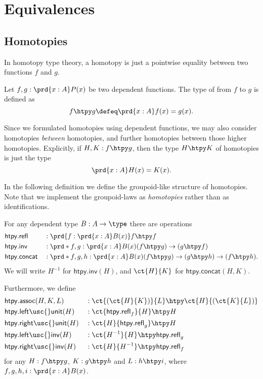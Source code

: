 \chapter{Equivalences}

\section{Homotopies}
In homotopy type theory, a homotopy is just a pointwise equality between two functions $f$ and $g$.

\begin{defn}
Let $f,g:\prd{x:A}P(x)$ be two dependent functions. The type of  from $f$ to $g$ is defined as
\begin{equation*}
f\htpy g \defeq \prd{x:A} f(x)=g(x).
\end{equation*}
\end{defn}

Since we formulated homotopies using dependent functions, we may also consider homotopies \emph{between} homotopies, and further homotopies between those higher homotopies. 
Explicitly, if $H,K:f\htpy g$, then the type $H\htpy K$ of homotopies is just the type
\begin{equation*}
\prd{x:A} H(x)=K(x).
\end{equation*}

In the following definition we define the groupoid-like structure of homotopies. Note that we implement the groupoid-laws as \emph{homotopies} rather than as identifications.

\begin{defn}\label{defn:htpy_groupoid}
For any dependent type $B:A\to\type$ there are operations
\begin{align*}
& \mathsf{htpy.refl} & & : \prd{f:\prd{x:A}B(x)}f\htpy f \\
& \mathsf{htpy.inv} & & : \prd*{f,g:\prd{x:A}B(x)} (f\htpy g)\to(g\htpy f) \\
& \mathsf{htpy.concat} & & : \prd*{f,g,h:\prd{x:A}B(x)} (f\htpy g)\to (g\htpy h)\to (f\htpy h).
\end{align*}
We will write $H^{-1}$ for $\mathsf{htpy.inv}(H)$, and $\ct{H}{K}$ for $\mathsf{htpy.concat}(H,K)$. 

Furthermore, we define
\begin{align*}
& \mathsf{htpy.assoc}(H,K,L) & & : \ct{(\ct{H}{K})}{L}\htpy\ct{H}{(\ct{K}{L})} \\
& \mathsf{htpy.left\usc{}unit}(H) & & : \ct{\mathsf{htpy.refl}_f}{H}\htpy H \\
& \mathsf{htpy.right\usc{}unit}(H) & & : \ct{H}{\mathsf{htpy.refl}_g}\htpy H \\
& \mathsf{htpy.left\usc{}inv}(H) & & : \ct{H^{-1}}{H} \htpy \mathsf{htpy.refl}_g \\
& \mathsf{htpy.right\usc{}inv}(H) & & : \ct{H}{H^{-1}} \htpy \mathsf{htpy.refl}_f
\end{align*}
for any $H:f\htpy g$, $K:g\htpy h$ and $L:h\htpy i$, where $f,g,h,i:\prd{x:A}B(x)$.
\end{defn}

